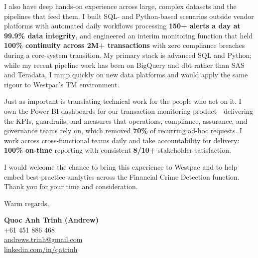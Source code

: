 \documentclass[11pt, a4paper]{article}
\begin{document}
I also have deep hands-on experience across large, complex datasets and the pipelines that feed them. I built SQL- and Python-based scenarios outside vendor platforms with automated daily workflows processing \textbf{150+ alerts a day at 99.9\% data integrity}, and engineered an interim monitoring function that held \textbf{100\% continuity across 2M+ transactions} with zero compliance breaches during a core-system transition. My primary stack is advanced SQL and Python; while my recent pipeline work has been on BigQuery and dbt rather than SAS and Teradata, I ramp quickly on new data platforms and would apply the same rigour to Westpac's TM environment.

Just as important is translating technical work for the people who act on it. I own the Power BI dashboards for our transaction monitoring product—delivering the KPIs, guardrails, and measures that operations, compliance, assurance, and governance teams rely on, which removed \textbf{70\%} of recurring ad-hoc requests. I work across cross-functional teams daily and take accountability for delivery: \textbf{100\% on-time} reporting with consistent \textbf{8/10+} stakeholder satisfaction.

I would welcome the chance to bring this experience to Westpac and to help embed best-practice analytics across the Financial Crime Detection function. Thank you for your time and consideration.

\vspace{14pt}

Warm regards,

\vspace{24pt}

\textbf{Quoc Anh Trinh (Andrew)}\\
+61 451 886 468\\
\href{mailto:andrews.trinh@gmail.com}{andrews.trinh@gmail.com}\\
\href{https://www.linkedin.com/in/qatrinh}{linkedin.com/in/qatrinh}
\end{document}
